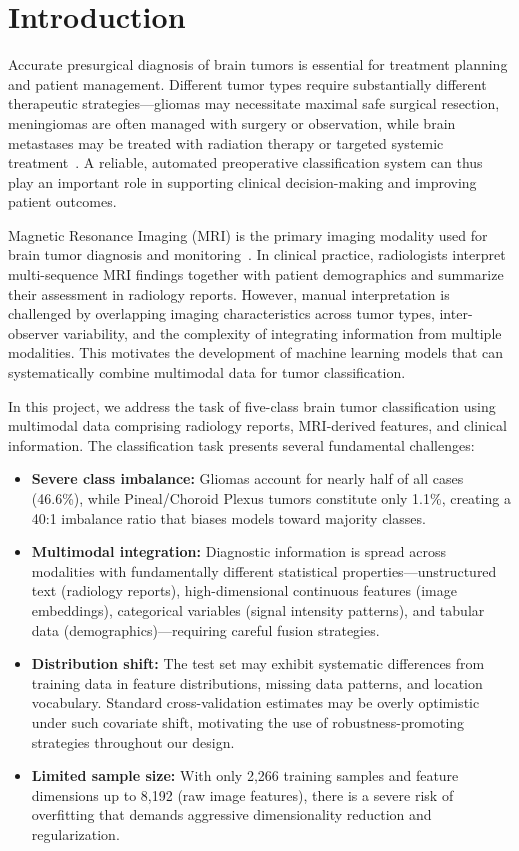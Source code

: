 \section{Introduction}
\label{sec:intro}

Accurate presurgical diagnosis of brain tumors is essential for treatment planning and patient management. Different tumor types require substantially different therapeutic strategies---gliomas may necessitate maximal safe surgical resection, meningiomas are often managed with surgery or observation, while brain metastases may be treated with radiation therapy or targeted systemic treatment~\cite{price2024}. A reliable, automated preoperative classification system can thus play an important role in supporting clinical decision-making and improving patient outcomes.

Magnetic Resonance Imaging (MRI) is the primary imaging modality used for brain tumor diagnosis and monitoring~\cite{wang2024}. In clinical practice, radiologists interpret multi-sequence MRI findings together with patient demographics and summarize their assessment in radiology reports. However, manual interpretation is challenged by overlapping imaging characteristics across tumor types, inter-observer variability, and the complexity of integrating information from multiple modalities. This motivates the development of machine learning models that can systematically combine multimodal data for tumor classification.

In this project, we address the task of five-class brain tumor classification using multimodal data comprising radiology reports, MRI-derived features, and clinical information. The classification task presents several fundamental challenges:

\begin{itemize}
  \item \textbf{Severe class imbalance:} Gliomas account for nearly half of all cases (46.6\%), while Pineal/Choroid Plexus tumors constitute only 1.1\%, creating a 40:1 imbalance ratio that biases models toward majority classes.
  \item \textbf{Multimodal integration:} Diagnostic information is spread across modalities with fundamentally different statistical properties---unstructured text (radiology reports), high-dimensional continuous features (image embeddings), categorical variables (signal intensity patterns), and tabular data (demographics)---requiring careful fusion strategies.
  \item \textbf{Distribution shift:} The test set may exhibit systematic differences from training data in feature distributions, missing data patterns, and location vocabulary. Standard cross-validation estimates may be overly optimistic under such covariate shift, motivating the use of robustness-promoting strategies throughout our design.
  \item \textbf{Limited sample size:} With only 2,266 training samples and feature dimensions up to 8,192 (raw image features), there is a severe risk of overfitting that demands aggressive dimensionality reduction and regularization.
\end{itemize}

